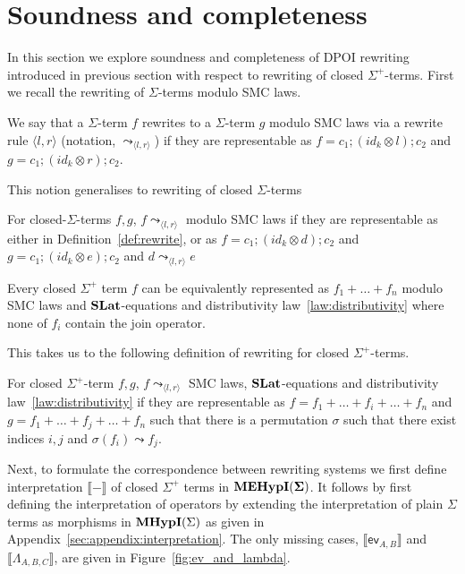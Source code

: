 \section{Soundness and completeness}

In this section we explore soundness and completeness of DPOI rewriting introduced in previous section with respect to rewriting of closed $\Sigma^{+}$-terms.
First we recall the rewriting of $\Sigma$-terms modulo SMC laws.

\begin{definition}
\label{def:rewrite}
    We say that a $\Sigma$-term $f$ rewrites to a $\Sigma$-term $g$ modulo SMC laws via a rewrite rule $\langle l, r \rangle$ (notation, $\leadsto_{\langle l, r \rangle}$) if they are representable as
    $
    f = c_{1};(id_{k} \otimes l);c_{2} $ and $ g = c_{1};(id_{k} \otimes r);c_{2}
    $.
\end{definition}
This notion generalises to rewriting of closed $\Sigma$-terms
\begin{definition}
    For closed-$\Sigma$-terms $f,g$, $f \leadsto_{\langle l, r \rangle}$ modulo SMC laws if they are representable as either in Definition~\ref{def:rewrite}, or as 
    $
    f = c_{1};(id_{k} \otimes d);c_{2} $ and $ g = c_{1};(id_{k} \otimes e);c_{2}
    $
    and $d \leadsto_{\langle l, r \rangle} e$
\end{definition}
\begin{lemma}
\label{lemma:normal_form}
    Every closed $\Sigma^{+}$ term $f$ can be equivalently represented as
    $
    f_{1} + \ldots + f_{n}
    $ modulo SMC laws and $\mathbf{SLat}$-equations and distributivity law~\ref{law:distributivity} where none of $f_{i}$ contain the join operator.
\end{lemma}
This takes us to the following definition of rewriting for closed $\Sigma^{+}$-terms.
\begin{definition}
    For closed $\Sigma^{+}$-term $f,g$, $f \leadsto_{\langle l, r \rangle}$ SMC laws, $\mathbf{SLat}$-equations and distributivity law~\ref{law:distributivity} if they are representable as
    $
    f = f_{1} + \ldots + f_{i} + \ldots + f_{n} $ and $ g = f_{1} + \ldots + f_{j} + \ldots + f_{n}
    $
    such that there is a permutation $\sigma$ such that there exist indices $i,j$ and $\sigma(f_{i}) \leadsto f_{j}$.
\end{definition}
Next, to formulate the correspondence between rewriting systems we first define interpretation $\llbracket - \rrbracket$ of closed $\Sigma^{+}$ terms in ${\mathbf{MEHypI(\Sigma)}}$.
It follows by first defining the interpretation of operators by extending the interpretation of plain $\Sigma$ terms as morphisms in $\textbf{MHypI}(\Sigma)$ as given in Appendix~\ref{sec:appendix:interpretation}.
The only missing cases, $\llbracket \textsf{ev}_{A,B} \rrbracket$ and $\llbracket \Lambda_{A,B,C} \rrbracket$, are given in Figure~\ref{fig:ev_and_lambda}.

